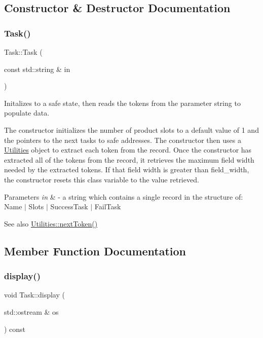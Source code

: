\subsection{Constructor \& Destructor Documentation}
\mbox{\label{class_task_ace3ff25451f6d46f6cc0f2d7ed4b16ef}} 
\subsubsection{\texorpdfstring{Task()}{Task()}}
{\footnotesize\ttfamily Task\+::\+Task (\begin{DoxyParamCaption}\item[{const std\+::string \&}]{in }\end{DoxyParamCaption})}



Initalizes to a safe state, then reads the tokens from the parameter string to populate data. 

The constructor initializes the number of product slots to a default value of 1 and the pointers to the next tasks to safe addresses. The constructor then uses a \mbox{\hyperlink{class_utilities}{Utilities}} object to extract each token from the record. Once the constructor has extracted all of the tokens from the record, it retrieves the maximum field width needed by the extracted tokens. If that field width is greater than field\+\_\+width, the constructor resets this class variable to the value retrieved. 
\begin{DoxyParams}{Parameters}
{\em in} & -\/ a string which contains a single record in the structure of\+: Name $\vert$ Slots $\vert$ Success\+Task $\vert$ Fail\+Task \\
\hline
\end{DoxyParams}
\begin{DoxySeeAlso}{See also}
\mbox{\hyperlink{class_utilities_a59c27deae1e3810d8591b35ed90b7f33}{Utilities\+::next\+Token()}} 
\end{DoxySeeAlso}


\subsection{Member Function Documentation}
\mbox{\label{class_task_aff00aecd7c14bd02434b76ad10a656a2}} 
\subsubsection{\texorpdfstring{display()}{display()}}
{\footnotesize\ttfamily void Task\+::display (\begin{DoxyParamCaption}\item[{std\+::ostream \&}]{os }\end{DoxyParamCaption}) const}



